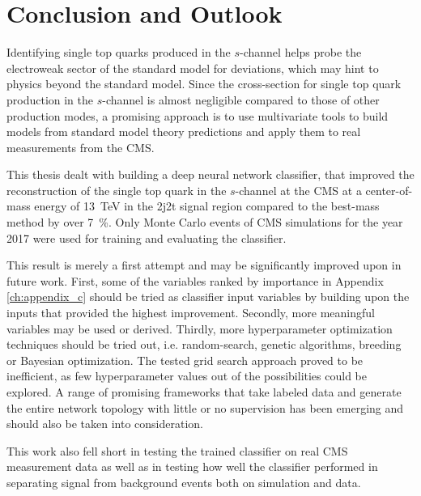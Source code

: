 \chapter{Conclusion and Outlook}
Identifying single top quarks produced in the $s$-channel helps probe the electroweak sector of the standard model for deviations, which may hint to physics beyond the standard model. Since the cross-section for single top quark production in the $s$-channel is almost negligible compared to those of other production modes, a promising approach is to use multivariate tools to build models from standard model theory predictions and apply them to real measurements from the CMS.

This thesis dealt with building a deep neural network classifier, that improved the reconstruction of the single top quark in the $s$-channel at the CMS at a center-of-mass energy of \SI{13}{TeV} in the 2j2t signal region compared to the best-mass method by over \SI{7}{\%}. Only Monte Carlo events of CMS simulations for the year 2017 were used for training and evaluating the classifier.

This result is merely a first attempt and may be significantly improved upon in future work. First, some of the variables ranked by importance in Appendix \ref{ch:appendix_c} should be tried as classifier input variables by building upon the inputs that provided the highest improvement. Secondly, more meaningful variables may be used or derived. Thirdly, more hyperparameter optimization techniques should be tried out, i.e. random-search, genetic algorithms, breeding or Bayesian optimization. The tested grid search approach proved to be inefficient, as few hyperparameter values out of the possibilities could be explored. A range of promising frameworks that take labeled data and generate the entire network topology with little or no supervision has been emerging and should also be taken into consideration.

This work also fell short in testing the trained classifier on real CMS measurement data as well as in testing how well the classifier performed in separating signal from background events both on simulation and data.